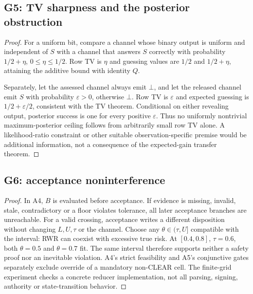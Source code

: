 \subsection{G5: TV sharpness and the posterior obstruction}
\begin{proof}
For a uniform bit, compare a channel whose binary output is uniform and independent of
$S$ with a channel that answers $S$ correctly with probability $1/2+\eta$,
$0\le\eta\le1/2$. Row TV is $\eta$ and guessing values are $1/2$ and
$1/2+\eta$, attaining the additive bound with identity $Q$.

Separately, let the assessed channel always emit $\bot$, and let the released
channel emit $S$ with probability $\varepsilon>0$, otherwise $\bot$.
Row TV is $\varepsilon$ and expected guessing is $1/2+\varepsilon/2$,
consistent with the TV theorem. Conditional on either revealing output,
posterior success is one for every positive $\varepsilon$.
Thus no uniformly nontrivial maximum-posterior ceiling follows from arbitrarily
small row TV alone. A likelihood-ratio constraint or other suitable
observation-specific premise would be additional information, not a consequence
of the expected-gain transfer theorem.
\end{proof}

\subsection{G6: acceptance noninterference}
\begin{proof}
In A4, $B$ is evaluated before acceptance. If evidence is missing, invalid,
stale, contradictory or a floor violates tolerance, all later acceptance
branches are unreachable. For a valid crossing, acceptance writes a different
disposition without changing $L,U,\tau$ or the channel. Choose any
$\theta\in(\tau,U]$ compatible with the interval: RWR can coexist with
excessive true risk. At $[0.4,0.8]$, $\tau=0.6$, both $\theta=0.5$ and
$\theta=0.7$ fit. The same interval therefore supports neither a safety proof
nor an inevitable violation. A4's strict feasibility and A5's conjunctive
gates separately exclude override of a mandatory non-CLEAR cell.
The finite-grid experiment checks a concrete reducer implementation, not
all parsing, signing, authority or state-transition behavior.
\end{proof}

